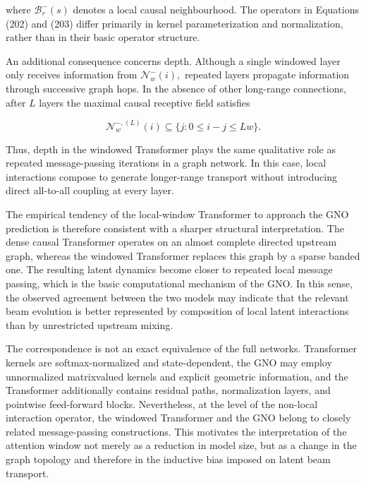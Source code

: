 where \(\mathcal{B}_{r}^{-} ( s )\) denotes a local causal neighbourhood. The operators in Equations (202) and (203) differ primarily in kernel parameterization and normalization, rather than in their basic operator structure.

An additional consequence concerns depth. Although a single windowed layer only receives information from \(\mathcal{N}_{w}^{-} ( i ) ,\) repeated layers propagate information through successive graph hops. In the absence of other long-range connections, after \(L\) layers the maximal causal receptive field satisfies

\begin{equation}
\label{eq:204}
\mathcal N_w^{-,(L)}(i)\subseteq\{j:0\le i-j\le Lw\}.
\end{equation}

Thus, depth in the windowed Transformer plays the same qualitative role as repeated message-passing iterations in a graph network. In this case, local interactions compose to generate longer-range transport without introducing direct all-to-all coupling at every layer.

The empirical tendency of the local-window Transformer to approach the GNO prediction is therefore consistent with a sharper structural interpretation. The dense causal Transformer operates on an almost complete directed upstream graph, whereas the windowed Transformer replaces this graph by a sparse banded one. The resulting latent dynamics become closer to repeated local message passing, which is the basic computational mechanism of the GNO. In this sense, the observed agreement between the two models may indicate that the relevant beam evolution is better represented by composition of local latent interactions than by unrestricted upstream mixing.

The correspondence is not an exact equivalence of the full networks. Transformer kernels are softmax-normalized and state-dependent, the GNO may employ unnormalized matrixvalued kernels and explicit geometric information, and the Transformer additionally contains residual paths, normalization layers, and pointwise feed-forward blocks. Nevertheless, at the level of the non-local interaction operator, the windowed Transformer and the GNO belong to closely related message-passing constructions. This motivates the interpretation of the attention window not merely as a reduction in model size, but as a change in the graph topology and therefore in the inductive bias imposed on latent beam transport.

